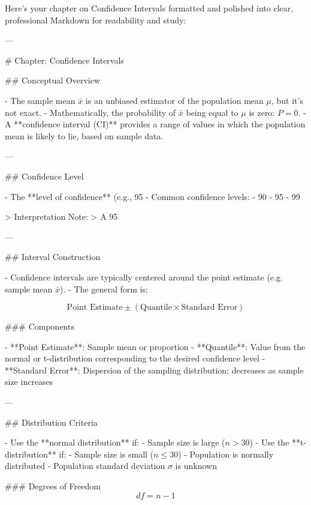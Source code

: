 Here’s your chapter on Confidence Intervals formatted and polished into clear, professional Markdown for readability and study:

---

# Chapter: Confidence Intervals

## Conceptual Overview

- The sample mean \( \bar{x} \) is an unbiased estimator of the population mean \( \mu \), but it's not exact.
- Mathematically, the probability of \( \bar{x} \) being equal to \( \mu \) is zero: \( P = 0 \).
- A **confidence interval (CI)** provides a range of values in which the population mean is likely to lie, based on sample data.

---

## Confidence Level

- The **level of confidence** (e.g., 95%
- Common confidence levels:
  - 90%
  - 95%
  - 99%

> Interpretation Note:  
> A 95%

---

## Interval Construction

- Confidence intervals are typically centered around the point estimate (e.g. sample mean \( \bar{x} \)).
- The general form is:

\[
\text{Point Estimate} \pm (\text{Quantile} \times \text{Standard Error})
\]

### Components

- **Point Estimate**: Sample mean or proportion
- **Quantile**: Value from the normal or t-distribution corresponding to the desired confidence level
- **Standard Error**: Dispersion of the sampling distribution; decreases as sample size increases

---

## Distribution Criteria

- Use the **normal distribution** if:
  - Sample size is large (\( n > 30 \))
- Use the **t-distribution** if:
  - Sample size is small (\( n \leq 30 \))
  - Population is normally distributed
  - Population standard deviation \( \sigma \) is unknown

### Degrees of Freedom
\[
df = n - 1
\]

